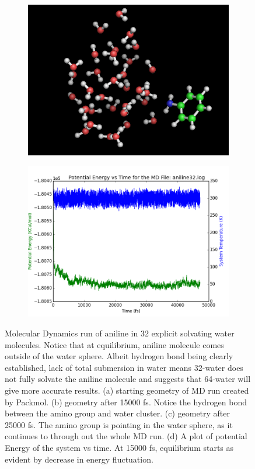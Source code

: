 \documentclass[
journal=jpcbfk, %
manuscript=article]{achemso}
\begin{document}
\begin{figure}[htb]
\begin{subfigure}[b]{0.4\textwidth}
		\includegraphics[width=1\textwidth]{CAMB3LYP/aniline32_25000fs.png}
		\caption{}
		\label{fig:MDEnergyAniline32c)}
	\end{subfigure}
	\hfill
	\begin{subfigure}[b]{0.4\textwidth}
		\includegraphics[width=1\textwidth]{CAMB3LYP/aniline32_EnergyPlot.png}
		\caption{}
		\label{fig:MDEnergyAniline32d)}
	\end{subfigure}
	\caption{Molecular Dynamics run of aniline in 32 explicit solvating water molecules. Notice that at equilibrium, aniline molecule comes outside of the water sphere. Albeit hydrogen bond being clearly established, lack of total submersion in water means 32-water does not fully solvate the aniline molecule and suggests that 64-water will give more accurate results. (a) starting geometry of MD run created by Packmol. (b) geometry after 15000 fs. Notice the hydrogen bond between the amino group and water cluster. (c) geometry after 25000 fs. The amino group is pointing in the water sphere, as it continues to through out the whole MD run. (d) A plot of potential Energy of the system vs time. At 15000 fs, equilibrium starts as evident by decrease in energy fluctuation.}
\end{figure}
\end{document}
